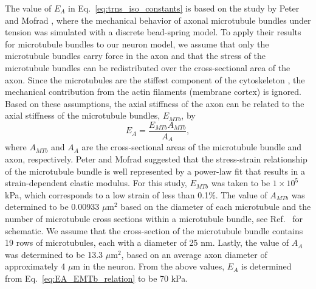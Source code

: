 \documentclass[]{interact}
\begin{document}
The value of $E_A$ in Eq.\ \eqref{eq:trns_iso_constants} is based on the study by Peter and Mofrad \citep{Peter:2012fc}, where the mechanical behavior of axonal microtubule bundles under tension was simulated with a discrete bead-spring model. To apply their results for microtubule bundles to our neuron model, we assume that only the microtubule bundles carry force in the axon and that the stress of the microtubule bundles can be redistributed over the cross-sectional area of the axon. Since the microtubules are the stiffest component of the cytoskeleton \citep{Fletcher:2010ku}, the mechanical contribution from the actin filaments (membrane cortex) is ignored. Based on these assumptions, the axial stiffness of the axon can be related to the axial stiffness of the microtubule bundles, $E_{MTb}$, by
%
\begin{equation}
E_A = \frac{E_{MTb} A_{MTb}}{A_A},
\label{eq:EA_EMTb_relation}
\end{equation}
%
where $A_{MTb}$ and $A_A$ are the cross-sectional areas of the microtubule bundle and axon, respectively. Peter and Mofrad \citep{Peter:2012fc} suggested that the stress-strain relationship of the microtubule bundle is well represented by a power-law fit that results in a strain-dependent elastic modulus. For this study, $E_{MTb}$ was taken to be $1\times 10^5$ kPa, which corresponds to a low strain of less than 0.1$\%$. The value of $A_{MTb}$ was determined to be 0.00933 $\mu$m${}^2$ based on the diameter of each microtubule and the number of microtubule cross sections within a microtubule bundle, see Ref.\ \citep{Peter:2012fc} for schematic. We assume that the cross-section of the microtubule bundle contains 19 rows of microtubules, each with a diameter of 25 nm. Lastly, the value of $A_A$ was determined to be 13.3 $\mu$m${}^2$, based on an average axon diameter of approximately 4 $\mu$m in the neuron. From the above values, $E_A$ is determined from Eq.\ \eqref{eq:EA_EMTb_relation} to be 70 kPa. 
\end{document}
